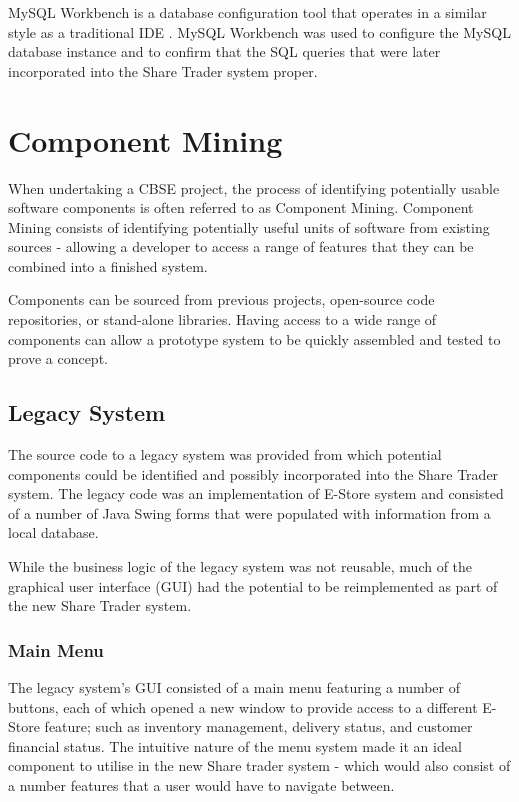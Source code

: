 \documentclass[12pt, a4paper,titlepage]{article}
\begin{document}
MySQL Workbench is a database configuration tool that operates in a similar
style as a traditional IDE \cite{Workbench}.
MySQL Workbench was used to configure the MySQL database instance and to
confirm that the SQL queries that were later incorporated into the Share
Trader system proper.


\section{Component Mining}
When undertaking a CBSE project, the process of identifying potentially usable
software components is often referred to as Component Mining.  
Component Mining consists of identifying potentially useful units of software
from existing sources - allowing a developer to access a range of features
that they can be combined into a finished system.

Components can be sourced from previous projects, open-source code
repositories, or stand-alone libraries. 
Having access to a wide range of components can allow a prototype system to be
quickly assembled and tested to prove a concept.

\subsection{Legacy System}
The source code to a legacy system was provided from which potential
components could be identified and possibly incorporated into the Share Trader
system.  
The legacy code was an implementation of E-Store system and consisted of a
number of Java Swing forms that were populated with information from a local
database.

While the business logic of the legacy system was not reusable, much of the
graphical user interface (GUI) had the potential to be reimplemented as part of
the new Share Trader system.

\subsubsection{Main Menu}
The legacy system’s GUI consisted of a main menu featuring a number of
buttons, each of which opened a new window to provide access to a different
E-Store feature; such as inventory management, delivery status, and customer
financial status.  
The intuitive nature of the menu system made it an ideal component to utilise
in the new Share trader system - which would also consist of a number features
that a user would have to navigate between.
\end{document}
